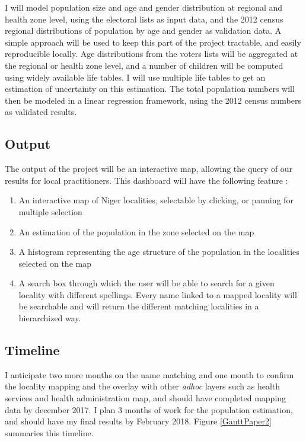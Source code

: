 I will model population size and age and gender distribution at regional and health zone level, using the electoral lists as input data, and the 2012 census regional distributions of population by age and gender as validation data. A simple approach will be used to keep this part of the project tractable, and easily reproducible locally. Age distributions from the voters lists will be aggregated at the regional or health zone level, and a number of children will be computed using widely available life tables. I will use multiple life tables to get an estimation of uncertainty on this estimation. The total population numbers will then be modeled in a linear regression framework, using the 2012 census numbers as validated results.

\subsection{Output}

The output of the project will  be an interactive map, allowing the query of our results for local practitioners. This dashboard will have the following feature :
\begin{enumerate}
	\item An interactive map of Niger localities, selectable by clicking, or panning for multiple selection
	\item An estimation of the population in the zone selected on the map
	\item A histogram representing the age structure of the population in the localities selected on the map
	\item A search box through which the user will be able to search for a given locality with different spellings. Every name linked to a mapped locality will be searchable and will return the different matching localities in a hierarchized way.
\end{enumerate}



\subsection{Timeline}
\label{timeline:aim2}
I anticipate two more months on the name matching and one month to confirm the locality mapping and the overlay with other \textit{adhoc} layers such as health services and health administration map, and should have completed mapping data by december 2017. I plan 3 months of work for the population estimation, and should have my final results by February 2018. Figure \ref{GanttPaper2} summaries this timeline.

